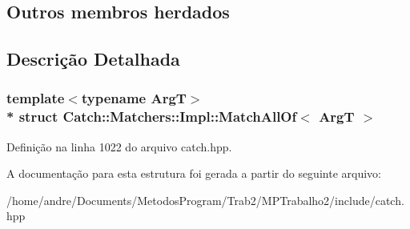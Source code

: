 \subsection*{Outros membros herdados}


\subsection{Descrição Detalhada}
\subsubsection*{template$<$typename ArgT$>$\\*
struct Catch\+::\+Matchers\+::\+Impl\+::\+Match\+All\+Of$<$ Arg\+T $>$}



Definição na linha 1022 do arquivo catch.\+hpp.



A documentação para esta estrutura foi gerada a partir do seguinte arquivo\+:\begin{DoxyCompactItemize}
\item 
/home/andre/\+Documents/\+Metodos\+Program/\+Trab2/\+M\+P\+Trabalho2/include/catch.\+hpp\end{DoxyCompactItemize}
